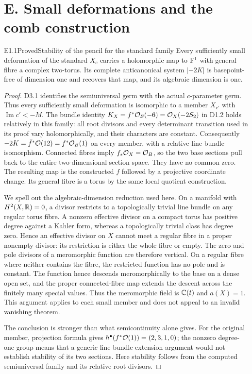 \section{E. Small deformations and the comb construction}

\begin{claim}{E1.1}{Proved}{Stability of the pencil for the standard family}
Every sufficiently small deformation of the standard $X_c$ carries a
holomorphic map to $\mathbb P^1$ with general fibre a complex two-torus. Its
complete anticanonical system $|-2K|$ is basepoint-free of dimension one
and recovers that map, and its algebraic dimension is one.
\end{claim}
\begin{proof}
D3.1 identifies the semiuniversal germ with the actual $c$-parameter
germ. Thus every sufficiently small deformation is isomorphic to a
member $X_{c'}$ with $\operatorname{Im}c'<-M$. The bundle identity
$K_X=\bar f^*\mathcal O_{\mathcal B}(-6)=\mathcal O_X(-2S_2)$ in D1.2 holds
relatively in this family: all root divisors and every determinant
transition used in its proof vary holomorphically, and their characters
are constant. Consequently $-2K=\bar f^*\mathcal O(12)=f^*\mathcal O_B(1)$
on every member, with a relative line-bundle isomorphism. Connected
fibres imply $f_*\mathcal O_X=\mathcal O_B$, so the two base sections pull back to
the entire two-dimensional section space. They have no common zero.
The resulting map is the constructed $f$ followed by a projective
coordinate change. Its general fibre is a torus by the same local
quotient construction.

We spell out the algebraic-dimension reduction used here. On a
manifold with $H^2(X,\mathbb R)=0$, a divisor restricts to a topologically
trivial line bundle on any regular torus fibre. A nonzero effective
divisor on a compact torus has positive degree against a Kahler form,
whereas a topologically trivial class has degree zero. Hence an
effective divisor on $X$ cannot meet a regular fibre in a proper
nonempty divisor: its restriction is either the whole fibre or empty.
The zero and pole divisors of a meromorphic function are therefore
vertical. On a regular fibre where neither contains the fibre, the
restricted function has no pole and is constant. The function hence
descends meromorphically to the base on a dense open set, and the
proper connected-fibre map extends the descent across the finitely
many special values. Thus the meromorphic field is $\mathbb C(t)$ and
$a(X)=1$. This argument applies to each small member and does not
appeal to an invalid vanishing theorem.

The conclusion is stronger than what semicontinuity alone gives.
For the original member, projection formula gives
$h^\bullet(f^*\mathcal O(1))=(2,3,1,0)$; the nonzero degree-one group means
that a generic line-bundle extension argument would not establish
stability of its two sections. Here stability follows from the
computed semiuniversal family and its relative root divisors.
\end{proof}

